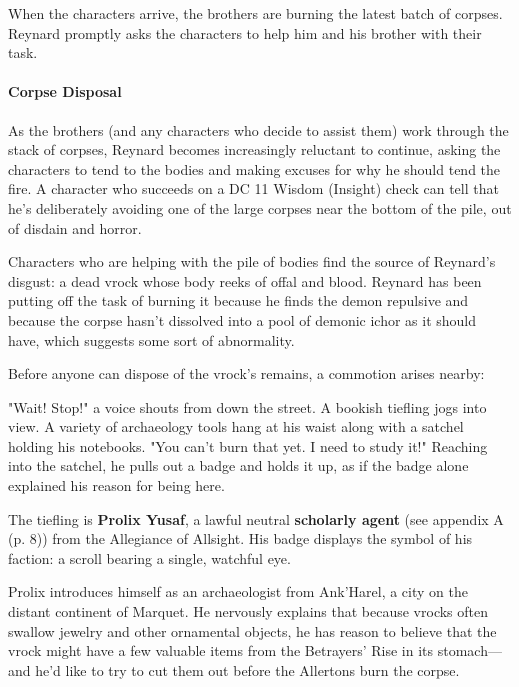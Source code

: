 \documentclass[a4paper, 11pt, bg=full, twocolumn, nooutline]{dndbook}
\begin{document}
When the characters arrive, the brothers are burning the latest batch of corpses. Reynard promptly asks the characters to help him and his brother with their task.

\paragraph{Corpse Disposal}

As the brothers (and any characters who decide to assist them) work through the stack of corpses, Reynard becomes increasingly reluctant to continue, asking the characters to tend to the bodies and making excuses for why he should tend the fire. A character who succeeds on a DC 11 Wisdom (Insight) check can tell that he's deliberately avoiding one of the large corpses near the bottom of the pile, out of disdain and horror.

Characters who are helping with the pile of bodies find the source of Reynard's disgust: a dead vrock whose body reeks of offal and blood. Reynard has been putting off the task of burning it because he finds the demon repulsive and because the corpse hasn't dissolved into a pool of demonic ichor as it should have, which suggests some sort of abnormality.

Before anyone can dispose of the vrock's remains, a commotion arises nearby:

\begin{DndReadAloud}
"Wait! Stop!" a voice shouts from down the street. A bookish tiefling jogs into view. A variety of archaeology tools hang at his waist along with a satchel holding his notebooks. "You can't burn that yet. I need to study it!" Reaching into the satchel, he pulls out a badge and holds it up, as if the badge alone explained his reason for being here.
\end{DndReadAloud}

The tiefling is \textbf{Prolix Yusaf}, a lawful neutral \textbf{scholarly agent} (see appendix A (p. 8)) from the Allegiance of Allsight. His badge displays the symbol of his faction: a scroll bearing a single, watchful eye.

Prolix introduces himself as an archaeologist from Ank'Harel, a city on the distant continent of Marquet. He nervously explains that because vrocks often swallow jewelry and other ornamental objects, he has reason to believe that the vrock might have a few valuable items from the Betrayers' Rise in its stomach---and he'd like to try to cut them out before the Allertons burn the corpse.
\end{document}
